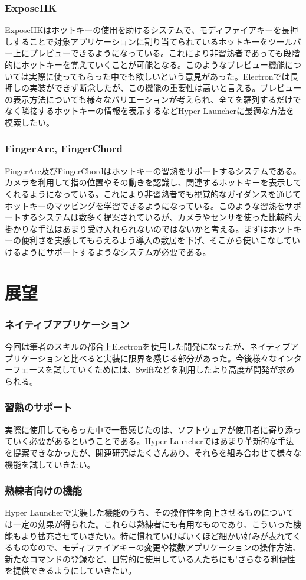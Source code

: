\subsubsection{ExposeHK}
ExposeHK\cite{exposehk}はホットキーの使用を助けるシステムで、モディファイアキーを長押しすることで対象アプリケーションに割り当てられているホットキーをツールバー上にプレビューできるようになっている。これにより非習熟者であっても段階的にホットキーを覚えていくことが可能となる。このようなプレビュー機能については実際に使ってもらった中でも欲しいという意見があった。Electronでは長押しの実装ができず断念したが、この機能の重要性は高いと言える。プレビューの表示方法についても様々なバリエーションが考えられ、全てを羅列するだけでなく隣接するホットキーの情報を表示するなどHyper Launcherに最適な方法を模索したい。

\subsubsection{FingerArc, FingerChord}
FingerArc及びFingerChord\cite{fingerarcandfinderchord}はホットキーの習熟をサポートするシステムである。カメラを利用して指の位置やその動きを認識し、関連するホットキーを表示してくれるようになっている。これにより非習熟者でも視覚的なガイダンスを通じてホットキーのマッピングを学習できるようになっている。このような習熟をサポートするシステムは数多く提案されているが、カメラやセンサを使った比較的大掛かりな手法はあまり受け入れられないのではないかと考える。まずはホットキーの便利さを実感してもらえるよう導入の敷居を下げ、そこから使いこなしていけるようにサポートするようなシステムが必要である。


\section{展望}

\subsubsection{ネイティブアプリケーション}
今回は筆者のスキルの都合上Electronを使用した開発になったが、ネイティブアプリケーションと比べると実装に限界を感じる部分があった。今後様々なインターフェースを試していくためには、Swiftなどを利用したより高度が開発が求められる。

\subsubsection{習熟のサポート}
実際に使用してもらった中で一番感じたのは、ソフトウェアが使用者に寄り添っていく必要があるということである。Hyper Launcherではあまり革新的な手法を提案できなかったが、関連研究はたくさんあり、それらを組み合わせて様々な機能を試していきたい。

\subsubsection{熟練者向けの機能}
Hyper Launcherで実装した機能のうち、その操作性を向上させるものについては一定の効果が得られた。これらは熟練者にも有用なものであり、こういった機能もより拡充させていきたい。特に慣れていけばいくほど細かい好みが表れてくるものなので、モディファイアキーの変更や複数アプリケーションの操作方法、新たなコマンドの登録など、日常的に使用している人たちにも’さらなる利便性を提供できるようにしていきたい。